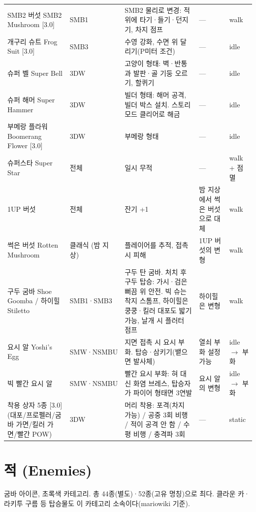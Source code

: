 \documentclass[10pt,a4paper]{article}
\begin{document}
\begin{longtable}{L{2.9cm} L{1.5cm} L{6.6cm} L{2.6cm} L{1.5cm}}
SMB2 버섯 SMB2 Mushroom [3.0] & SMB1 & SMB2 물리로 변경: 적 위에 타기·들기·던지기, 차지 점프 & — & walk \\
개구리 슈트 Frog Suit [3.0] & SMB3 & 수영 강화, 수면 위 달리기(P미터 조건) & — & idle \\
슈퍼 벨 Super Bell & 3DW & 고양이 형태: 벽·반통과 발판·골 기둥 오르기, 할퀴기 & — & idle \\
슈퍼 해머 Super Hammer & 3DW & 빌더 형태: 해머 공격, 빌더 박스 설치. 스토리 모드 클리어로 해금 & — & idle \\
부메랑 플라워 Boomerang Flower [3.0] & 3DW & 부메랑 형태 & — & idle \\
슈퍼스타 Super Star & 전체 & 일시 무적 & — & walk + 점멸 \\
1UP 버섯 & 전체 & 잔기 +1 & 밤 지상에서 썩은 버섯으로 대체 & walk \\
썩은 버섯 Rotten Mushroom & 클래식 (밤 지상) & 플레이어를 추적, 접촉 시 피해 & 1UP 버섯의 변형 & walk \\
구두 굼바 Shoe Goomba / 하이힐 Stiletto & SMB1·SMB3 & 구두 탄 굼바. 처치 후 구두 탑승: 가시·검은 뻐끔 위 안전. 빅 슈는 착지 스톰프, 하이힐은 쿵쿵·킬러 대포도 밟기 가능, 날개 시 플러터 점프 & 하이힐은 변형 & walk \\
요시 알 Yoshi's Egg & SMW·NSMBU & 지면 접촉 시 요시 부화. 탑승·삼키기(뱉으면 발사체) & 열쇠 부화 설정 가능 & idle $\to$ 부화 \\
빅 빨간 요시 알 & SMW·NSMBU & 빨간 요시 부화: 혀 대신 화염 브레스, 탑승자가 파이어 형태면 3연발 & 요시 알의 변형 & idle $\to$ 부화 \\
착용 상자 5종 [3.0] (대포/프로펠러/굼바 가면/킬러 가면/빨간 POW) & 3DW & 머리 착용: 포격(차지 가능) / 공중 3회 비행 / 적이 공격 안 함 / 수평 비행 / 충격파 3회 & — & static \\
\bottomrule
\end{longtable}

\section{적 (Enemies)}

굼바 아이콘, 초록색 카테고리. 총 44종(별도)·52종(고유 명칭)으로 최다.
클라운 카·라키투 구름 등 탑승물도 이 카테고리 소속이다(mariowiki 기준).
\end{document}
